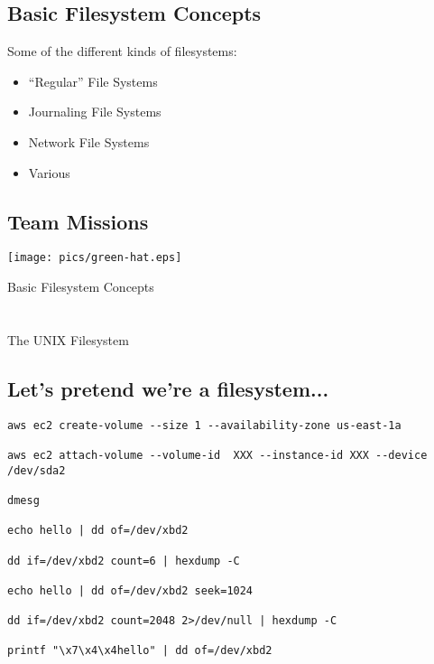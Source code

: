 \documentclass[xga]{xdvislides}
\begin{document}
\subsection{Basic Filesystem Concepts}
Some of the different kinds of filesystems:
\begin{itemize}
	\item ``Regular'' File Systems
	\item Journaling File Systems
	\item Network File Systems
	\item Various
\end{itemize}

\subsection{Team Missions}

\vspace*{\fill}
\begin{center}
\texttt{[image: pics/green-hat.eps]}
\end{center}
\vspace*{\fill}


\newpage
\vspace*{\fill}
\begin{center}
	\Hugesize
		Basic Filesystem Concepts\\ [1em]
	\hspace*{5mm}
	\blueline\\
	\hspace*{5mm}\\
		The UNIX Filesystem
\end{center}
\vspace*{\fill}

\subsection{Let's pretend we're a filesystem...}

\begin{verbatim}
aws ec2 create-volume --size 1 --availability-zone us-east-1a

aws ec2 attach-volume --volume-id  XXX --instance-id XXX --device /dev/sda2

dmesg

echo hello | dd of=/dev/xbd2

dd if=/dev/xbd2 count=6 | hexdump -C

echo hello | dd of=/dev/xbd2 seek=1024

dd if=/dev/xbd2 count=2048 2>/dev/null | hexdump -C

printf "\x7\x4\x4hello" | dd of=/dev/xbd2
\end{verbatim}
\end{document}
